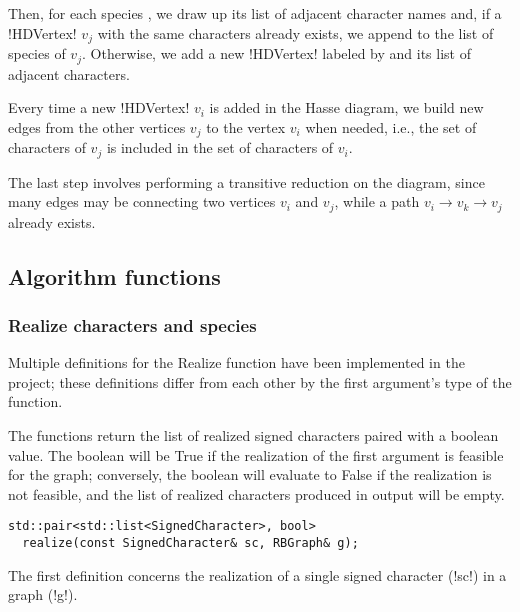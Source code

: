 Then, for each species \species[i], we draw up its list of adjacent character names and, if a !HDVertex! $v_{j}$ with the same characters already exists, we append \species[i] to the list of species of $v_{j}$. Otherwise, we add a new !HDVertex! labeled by \species[i] and its list of adjacent characters.

Every time a new !HDVertex! $v_{i}$ is added in the Hasse diagram, we build new edges from the other vertices $v_{j}$ to the vertex $v_{i}$ when needed, i.e., the set of characters of $v_{j}$ is included in the set of characters of $v_{i}$.

The last step involves performing a transitive reduction on the diagram, since many edges may be connecting two vertices $v_{i}$ and $v_{j}$, while a path $v_{i} \rightarrow v_{k} \rightarrow v_{j}$ already exists.

\subsection{Algorithm functions}\label{section:algorithm-functions}


\subsubsection{Realize characters and species}\label{section:realize}

Multiple definitions for the Realize function have been implemented in the project; these definitions differ from each other by the first argument's type of the function.

The functions return the list of realized signed characters paired with a boolean value. The boolean will be True if the realization of the first argument is feasible for the graph; conversely, the boolean will evaluate to False if the realization is not feasible, and the list of realized characters produced in output will be empty.

\text{} %

\begin{lstlisting}[moreemph={RBGraph, SignedCharacter},
                   moreemph={[2]realize}]
  std::pair<std::list<SignedCharacter>, bool>
  realize(const SignedCharacter& sc, RBGraph& g);
\end{lstlisting}

The first definition concerns the realization of a single signed character \character[][\pm] (!sc!) in a graph \grb{} (!g!).

